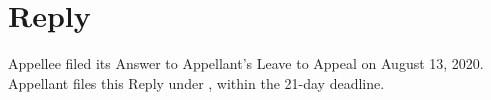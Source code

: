 \documentclass[12pt,\documentclassflag]{michiganCourtOfAppealsBrief}
\begin{document}






\newpage
\pagestyle{plain}


\section{Reply}

Appellee filed its Answer to Appellant's Leave to Appeal on August 13, 2020. Appellant files this Reply under \cite{MCR 7.305(E)}, within the 21-day deadline.
\end{document}
